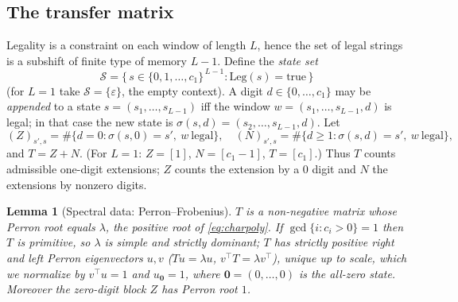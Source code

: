 \documentclass[12pt]{article}
\newtheorem{lemma}{Lemma}
\theoremstyle{definition}
\begin{document}
\subsection{The transfer matrix}\label{ss:transfer}
Legality is a constraint on each window of length $L$, hence the set of legal
strings is a subshift of finite type of memory $L-1$. Define the
\emph{state set}
\begin{equation}\label{eq:states}
\mathcal S=\Big\{\, s\in\{0,1,\dots,c_1\}^{\,L-1}: \mathrm{Leg}(s)=\text{true}\,\Big\}
\end{equation}
(for $L=1$ take $\mathcal S=\{\varepsilon\}$, the empty context). A digit
$d\in\{0,\dots,c_1\}$ may be \emph{appended} to a state $s=(s_1,\dots,s_{L-1})$
iff the window $w=(s_1,\dots,s_{L-1},d)$ is legal; in that case the new state is
$\sigma(s,d)=(s_2,\dots,s_{L-1},d)$. Let
\begin{equation}\label{eq:ZN}
(Z)_{s',s}=\#\{d=0:\sigma(s,0)=s',\ w\ \text{legal}\},\quad
(N)_{s',s}=\#\{d\ge1:\sigma(s,d)=s',\ w\ \text{legal}\},
\end{equation}
and $T=Z+N$. (For $L=1$: $Z=[1]$, $N=[c_1-1]$, $T=[c_1]$.) Thus $T$ counts
admissible one-digit extensions; $Z$ counts the extension by a $0$ digit and $N$
the extensions by nonzero digits.

\begin{lemma}[Spectral data: Perron--Frobenius]\label{lem:PF}
$T$ is a non-negative matrix whose Perron root equals $\lambda$, the positive
root of \eqref{eq:charpoly}. If $\gcd\{i:c_i>0\}=1$ then $T$ is primitive, so
$\lambda$ is simple and strictly dominant; $T$ has strictly positive right and
left Perron eigenvectors $u,v$ ($Tu=\lambda u$, $v^\top T=\lambda v^\top$),
unique up to scale, which we normalize by $v^\top u=1$ and $u_{\mathbf 0}=1$,
where $\mathbf 0=(0,\dots,0)$ is the all-zero state. Moreover the zero-digit
block $Z$ has Perron root $1$.
\end{lemma}
\end{document}
